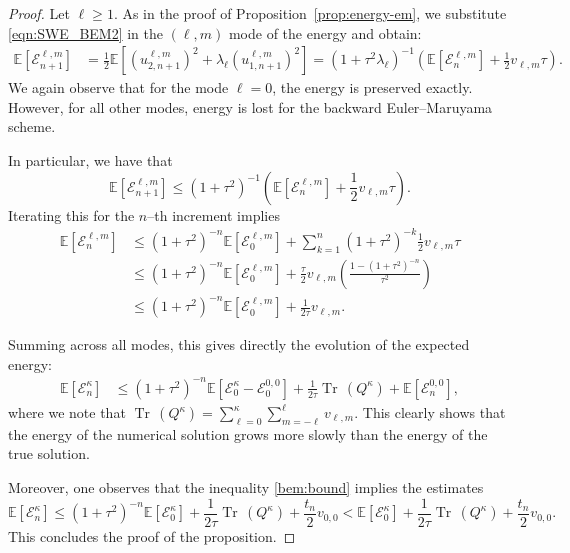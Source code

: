 \documentclass[11pt]{amsart}
\newcommand{\E}{{\mathbb E}}
\newcommand{\tr}{{\operatorname{Tr}\, }}
\newcommand{\cE}{\mathcal E}
\begin{document}
\begin{proof}	
	Let $\ell\geq 1$. As in the proof of Proposition~\ref{prop:energy-em}, we substitute \eqref{eqn:SWE_BEM2} in the $(\ell, m)$ mode of the energy and obtain:
	\begin{align*}
		\E\left[\cE^{\ell, m}_{n+1}\right] &= \frac{1}{2}\E\left[\left(u^{\ell, m}_{2, n+1}\right)^2 + \lambda_\ell \left(u^{\ell, m}_{1, n+1}\right)^2\right]=\left(1 + \tau^2\lambda_\ell\right)^{-1} \left(\E\left[\cE^{\ell, m}_{n}\right] + \frac{1}2v_{\ell, m}\tau\right).
	\end{align*}
	We again observe that for the mode $\ell = 0$, the energy is preserved exactly.
	However, for all other modes, energy is lost for the backward Euler--Maruyama scheme.
	
	In particular, we have that
	\[
	\E\left[\cE^{\ell, m}_{n+1}\right] \leq \left(1 + \tau^2\right)^{-1} \left(\E\left[\cE^{\ell, m}_{n}\right] + \frac{1}2v_{\ell, m}\tau\right).
	\]
	Iterating this for the $n$--th increment implies
	\begin{align*}
		\E\left[\cE^{\ell, m}_{n}\right] &\leq \left(1+\tau^2\right)^{-n} \E\left[\cE^{\ell, m}_{0}\right] + \sum_{k=1}^{n}\left(1+\tau^2\right)^{-k}\frac{1}{2}v_{\ell, m}\tau\\
		& \leq (1+\tau^2)^{-n} \E\left[\cE^{\ell, m}_{0}\right]  + \frac{\tau}{2}v_{\ell,m} \left(\frac{1-\left(1 + \tau^2\right)^{-n} }{\tau^2}\right)\\
		& \leq (1+\tau^2)^{-n} \E\left[\cE^{\ell, m}_{0}\right]  + \frac{1}{2\tau}v_{\ell,m}.
	\end{align*}
	
	Summing across all modes, this gives directly the evolution of the expected energy:
	\begin{align}\label{bem:bound}
		\E\left[\cE^\kappa_n\right] &\leq \left(1+\tau^2\right)^{-n} \E\left[\cE^\kappa_0 - \cE_0^{0, 0}\right]+ \frac{1}{2\tau}\tr\left(Q^\kappa\right) + \E\left[\cE_n^{0,0}\right],
	\end{align}
    where we note that $\tr\left(Q^\kappa\right)=\sum_{\ell=0}^{\kappa}\sum_{m=-\ell}^{\ell} v_{\ell,m}$.
	This clearly shows that the energy of the numerical solution grows more slowly than the energy of the true solution. 

    Moreover, one observes that the inequality \eqref{bem:bound} implies the estimates
	\begin{equation*}
		\E\left[\cE^\kappa_n\right] \leq (1+\tau^2)^{-n} \E\left[\cE^\kappa_0\right]+ \frac{1}{2\tau}\tr\left(Q^\kappa\right) + \frac {t_n} {2} v_{0,0} < \E\left[\cE^\kappa_0\right]+ \frac{1}{2\tau}\tr\left(Q^\kappa\right) + \frac {t_n} {2} v_{0,0}.
	\end{equation*}
	This concludes the proof of the proposition.
\end{proof}
\end{document}
